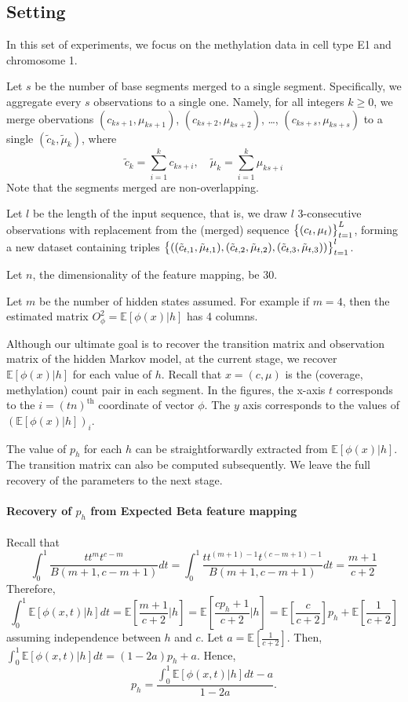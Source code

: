 \documentclass{article}
\def\E{\mathbb{E}}
\begin{document}
\subsection{Setting}
In this set of experiments, we focus on the methylation data in cell type E1 and chromosome 1.

Let $s$ be the number of base segments merged to a single segment. Specifically, we aggregate every $s$ observations to a single one. Namely, for all integers $k \geq 0$, we merge obervations $(c_{ks+1}, \mu_{ks+1})$, $(c_{ks+2}, \mu_{ks+2})$, \ldots, $(c_{ks+s}, \mu_{ks+s})$ to a single $(\tilde{c}_k, \tilde{\mu}_k)$, where
\[ \tilde{c}_k = \sum_{i=1}^k c_{ks+i}, \quad \tilde{\mu}_k = \sum_{i=1}^k \mu_{ks+i}\]
Note that the segments merged are non-overlapping.


Let $l$ be the length of the input sequence, that is, we draw $l$ 3-consecutive observations with replacement from the (merged) sequence $\cbr{(c_t, \mu_t)}_{t=1}^{L}$, forming a new dataset containing triples $\cbr{((\tilde{c}_{t,1}, \tilde{\mu}_{t,1}), (\tilde{c}_{t,2}, \tilde{\mu}_{t,2}), (\tilde{c}_{t,3}, \tilde{\mu}_{t,3}))}_{t=1}^{l}$.

Let $n$, the dimensionality of the feature mapping, be 30.

Let $m$ be the number of hidden states assumed. For example if $m = 4$, then the estimated matrix $O^2_{\phi} = \E[\phi(x)|h]$ has 4 columns.


Although our ultimate goal is to recover the transition matrix and observation matrix of the hidden Markov model, at the current stage, we recover $\E[\phi(x)|h]$ for each value of $h$. Recall that $x = (c, \mu)$ is the (coverage, methylation) count pair in each segment. In the figures, the x-axis $t$ corresponds to the $i = (tn)^{\text{th}}$ coordinate of vector $\phi$. The $y$ axis corresponds to the values of $(\E[\phi(x)|h])_i$.


The value of $p_h$ for each $h$ can be straightforwardly extracted from $\E[\phi(x)|h]$. The transition matrix can also be computed subsequently. We leave the full recovery of the parameters to the next stage.

\paragraph{Recovery of $p_h$ from Expected Beta feature mapping}
Recall that
\[ \int_0^1 \frac{t t^{m}t^{c-m}}{B(m+1,c-m+1)} dt = \int_0^1 \frac{t t^{(m+1)-1}t^{(c-m+1)-1}}{B(m+1,c-m+1)} dt = \frac{m+1}{c+2} \]
Therefore,
\[ \int_0^1 \E[\phi(x,t) | h] dt = \E[\frac{m+1}{c+2} | h] = \E[\frac{cp_h + 1}{c + 2} | h] = \E[\frac{c}{c+2}] p_h + \E[\frac{1}{c+2}] \]
assuming independence between $h$ and $c$.
Let $a = \E[\frac{1}{c+2}]$. Then, $\int_0^1 \E[\phi(x,t) | h] dt = (1 - 2a) p_h + a$.
Hence,
\[ p_h = \frac{\int_0^1 \E[\phi(x,t) | h] dt - a}{1 - 2 a}. \]
\end{document}
